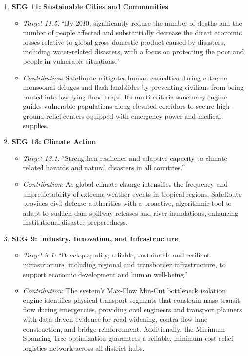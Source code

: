 \documentclass[12pt,oneside]{report}
\begin{document}
\begin{enumerate}
    \item \textbf{SDG 11: Sustainable Cities and Communities}
    \begin{itemize}
        \item \textit{Target 11.5:} ``By 2030, significantly reduce the number of deaths and the number of people affected and substantially decrease the direct economic losses relative to global gross domestic product caused by disasters, including water-related disasters, with a focus on protecting the poor and people in vulnerable situations.''
        \item \textit{Contribution:} SafeRoute mitigates human casualties during extreme monsoonal deluges and flash landslides by preventing civilians from being routed into low-lying flood traps. Its multi-criteria sanctuary engine guides vulnerable populations along elevated corridors to secure high-ground relief centers equipped with emergency power and medical supplies.
    \end{itemize}
    
    \item \textbf{SDG 13: Climate Action}
    \begin{itemize}
        \item \textit{Target 13.1:} ``Strengthen resilience and adaptive capacity to climate-related hazards and natural disasters in all countries.''
        \item \textit{Contribution:} As global climate change intensifies the frequency and unpredictability of extreme weather events in tropical regions, SafeRoute provides civil defense authorities with a proactive, algorithmic tool to adapt to sudden dam spillway releases and river inundations, enhancing institutional disaster preparedness.
    \end{itemize}
    
    \item \textbf{SDG 9: Industry, Innovation, and Infrastructure}
    \begin{itemize}
        \item \textit{Target 9.1:} ``Develop quality, reliable, sustainable and resilient infrastructure, including regional and transborder infrastructure, to support economic development and human well-being.''
        \item \textit{Contribution:} The system's Max-Flow Min-Cut bottleneck isolation engine identifies physical transport segments that constrain mass transit flow during emergencies, providing civil engineers and transport planners with data-driven evidence for road widening, contra-flow lane construction, and bridge reinforcement. Additionally, the Minimum Spanning Tree optimization guarantees a reliable, minimum-cost relief logistics network across all district hubs.
    \end{itemize}
\end{enumerate}
\end{document}
